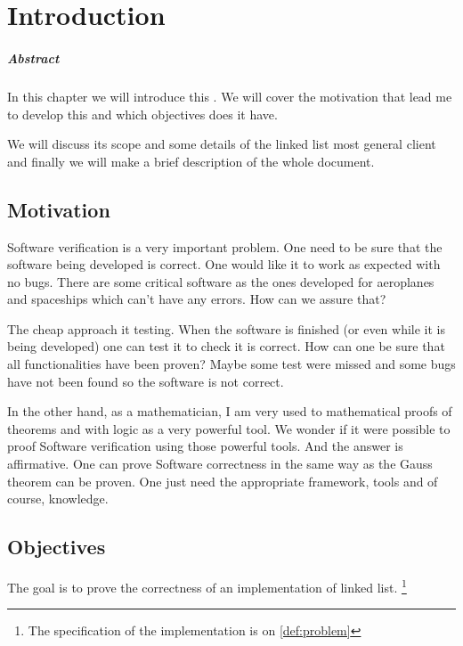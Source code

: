 \chapter{Introduction\label{chap:introduction}}

\paragraph{Abstract}

In this chapter we will introduce this \thisworkm. We will cover the motivation that lead me to develop this \thisworkm and which objectives does it have.

We will discuss its scope and some details of the linked list most general client and finally we will make a brief description of the whole document. 

\section{Motivation}

Software verification is a very important problem. One need to be sure that the software being developed is correct. One would like it to work as expected with no bugs. There are some critical software as the ones developed for aeroplanes and spaceships which can't have any errors. How can we assure that?

The cheap approach it testing. When the software is finished (or even while it is being developed) one can test it to check it is correct. How can one be sure that all functionalities have been proven? Maybe some test were missed and some bugs have not been found so the software is not correct.

In the other hand, as a mathematician, I am very used to mathematical proofs of theorems and with logic as a very powerful tool. We wonder if it were possible to proof Software verification using those powerful tools. And the answer is affirmative. One can prove Software correctness in the same way as the Gauss theorem can be proven. One just need the appropriate framework, tools and of course, knowledge.

\section{Objectives}

The goal is to prove the correctness of an implementation of linked list. \footnote{The specification of the implementation is on \ref{def:problem}}

